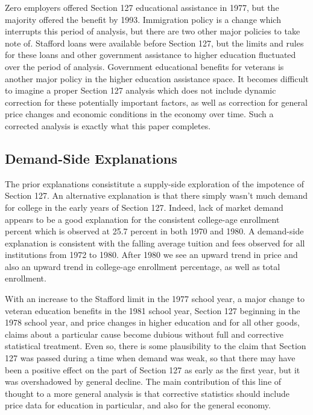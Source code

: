 \documentclass[review]{elsarticle}
\begin{document}
    Zero employers offered Section 127 educational assistance in 1977, but the majority offered the benefit by 1993.
    Immigration policy is a change which interrupts this period of analysis, but there are two other major policies to take note of.
    Stafford loans were available before Section 127, but the limits and rules for these loans and other government assistance to higher education fluctuated over the period of analysis.
    Government educational benefits for veterans is another major policy in the higher education assistance space.
    It becomes difficult to imagine a proper Section 127 analysis which does not include dynamic correction for these potentially important factors,
    as well as correction for general price changes and economic conditions in the economy over time.
    Such a corrected analysis is exactly what this paper completes.

    \subsection{Demand-Side Explanations}
    The prior explanations consistitute a supply-side exploration of the impotence of Section 127.
    An alternative explanation is that there simply wasn't much demand for college in the early years of Section 127.
    Indeed, lack of market demand appears to be a good explanation for the consistent college-age enrollment percent
    which is observed at 25.7 percent in both 1970 and 1980.
    A demand-side explanation is consistent with the falling average tuition and fees observed for all institutions from 1972 to 1980.
    After 1980 we see an upward trend in price and also an upward trend in college-age enrollment percentage, as well as total enrollment.

    With an increase to the Stafford limit in the 1977 school year,
    a major change to veteran education benefits in the 1981 school year,
    Section 127 beginning in the 1978 school year,
    and price changes in higher education and for all other goods,
    claims about a particular cause become dubious without full and corrective statistical treatment.
    Even so,
    there is some plausibility to the claim that Section 127 was passed during a time when demand was weak,
    so that there may have been a positive effect on the part of Section 127 as early as the first year,
    but it was overshadowed by general decline.
    The main contribution of this line of thought to a more general analysis is that corrective statistics should include price data
    for education in particular, and also for the general economy.
\end{document}
